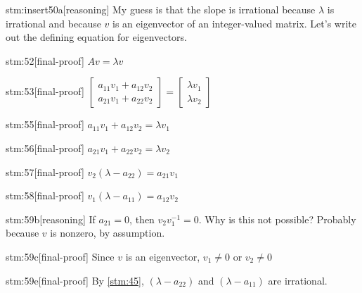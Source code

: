 \documentclass{article}
\begin{document}
\begin{stm}{stm:insert50a}[reasoning]
My guess is that the slope is irrational because $\lambda$ is irrational and because $v$ is an eigenvector of an integer-valued matrix. Let's write out the defining equation for eigenvectors.
\end{stm}

\begin{stm}{stm:52}[final-proof]
$A v = \lambda v$
\end{stm}

\begin{stm}{stm:53}[final-proof]
$\begin{bmatrix} a_{11}v_1 + a_{12}v_2 \\ a_{21}v_1 + a_{22}v_2 \end{bmatrix} = \begin{bmatrix} \lambda v_1 \\ \lambda v_2 \end{bmatrix}$
\end{stm}

\begin{stm}{stm:55}[final-proof]
$a_{11}v_1 + a_{12}v_2 = \lambda v_1$
\end{stm}

\begin{stm}{stm:56}[final-proof]
$a_{21}v_1 + a_{22}v_2 = \lambda v_2$
\end{stm}

\begin{stm}{stm:57}[final-proof]
$v_2(\lambda - a_{22}) = a_{21}v_1$
\end{stm}

\begin{stm}{stm:58}[final-proof]
$v_1(\lambda - a_{11}) = a_{12}v_2$
\end{stm}

\begin{stm}{stm:59b}[reasoning]
If $a_{21} = 0$, then $v_2 v_1^{-1} = 0$. Why is this not possible? Probably because $v$ is nonzero, by assumption.
\end{stm}

\begin{stm}{stm:59c}[final-proof]
Since $v$ is an eigenvector, $v_1 \ne 0$ or $v_2 \ne 0$
\end{stm}

\begin{stm}{stm:59e}[final-proof]
By \ref{stm:45}, $(\lambda - a_{22})$ and $(\lambda - a_{11})$ are irrational.
\end{stm}
\end{document}
